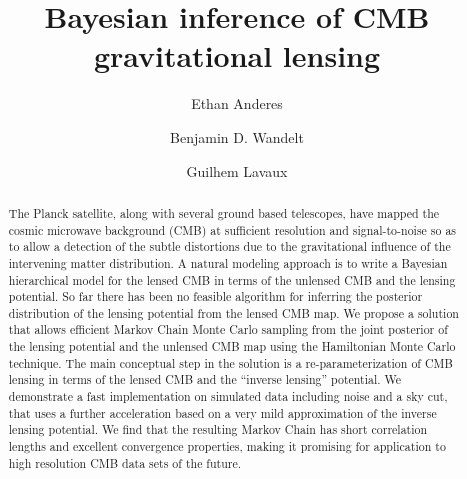 \documentclass[iop,revtex4,apj,onecolumn]{emulateapj}
\begin{document}
\title{Bayesian inference of CMB gravitational lensing}

\author{Ethan Anderes}

\author{Benjamin D. Wandelt}
\author{Guilhem Lavaux}



\begin{abstract} 
The Planck satellite, along with several ground based telescopes, have mapped the  cosmic microwave background (CMB) at sufficient resolution and signal-to-noise so as to allow a detection of the subtle distortions  due to the gravitational influence of the intervening  matter distribution. A natural modeling approach is to write a Bayesian hierarchical model for the lensed CMB in terms of the unlensed CMB and the lensing potential. So far there has been no feasible algorithm for inferring the posterior distribution of the lensing potential from the lensed CMB map. We propose a solution that allows efficient Markov Chain Monte Carlo sampling from the joint posterior of the lensing potential and the unlensed CMB map using the Hamiltonian Monte Carlo technique. The main conceptual step in the solution is  a re-parameterization of CMB lensing in terms of the lensed CMB and the ``inverse lensing'' potential. We demonstrate a fast implementation on simulated data including noise and a sky cut, that uses a further acceleration based on a very mild approximation of the inverse lensing potential.  We find that the resulting Markov Chain has short correlation lengths and excellent convergence properties, making it promising for application to high resolution CMB data sets of the future.
\end{abstract}

\end{document}

